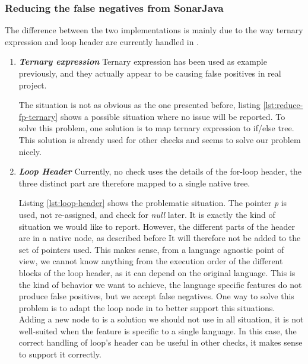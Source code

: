 \subsubsection{Reducing the false negatives from SonarJava}
\label{subsec:reducing_false_positive_sonarjava}

The difference between the two implementations is mainly due to the way ternary expression and loop header are currently handled in \slang{}.
\begin{enumerate}
	\item \textbf{\textit{Ternary expression}} \newline 
	\label{subsubsec:reducing_false_positive_ternary}
	Ternary expression has been used as example previously, and they actually appear to be causing false positives in real project.
	
	
	
	The situation is not as obvious as the one presented before, listing \ref{lst:reduce-fp-ternary} shows a possible situation where no issue will be reported. 
	To solve this problem, one solution is to map ternary expression to if/else tree.
	This solution is already used for other checks and seems to solve our problem nicely.
	
	\item \textbf{\textit{Loop Header}} \newline 	
	\label{subsubsec:loop_header}
	Currently, no check uses the details of the for-loop header, the three distinct part are therefore mapped to a single native tree. 
	
	
	
	Listing \ref{lst:loop-header} shows the problematic situation. 
	The pointer \emph{p} is used, not re-assigned, and check for \emph{null} later. 
	It is exactly the kind of situation we would like to report. 
	However, the different parts of the header are in a native node, as described before
	It will therefore not be added to the set of pointers used.
	This makes sense, from a language agnostic point of view, we cannot know anything from the execution order of the different blocks of the loop header, as it can depend on the original language.
	This is the kind of behavior we want to achieve, the language specific features do not produce false positives, but we accept false negatives.
	One way to solve this problem is to adapt the loop node in \slang{} to better support this situations.
	Adding a new node to \slang{} is a solution we should not use in all situation, it is not well-suited when the feature is specific to a single language.
	In this case, the correct handling of loop's header can be useful in other checks, it makes sense to support it correctly.
\end{enumerate}

